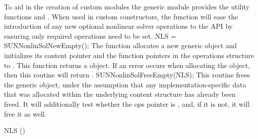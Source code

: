 To aid in the creation of custom {\sunnonlinsol} modules the generic
{\sunnonlinsol} module provides the utility functions 
and . When used in custom {\sunnonlinsol} constructors,
the function  will ease the introduction of any new
optional nonlinear solver operations to the {\sunnonlinsol} API by ensuring only
required operations need to be set.
%
%
{
  NLS = SUNNonlinSolNewEmpty();
}
{
  The function  allocates a new generic {\sunnonlinsol}
  object and initializes its content pointer and the function pointers in the
  operations structure to .
}
{}
{
  This function returns a  object. If an error occurs when
  allocating the object, then this routine will return .
}
{}
%
%
{
  SUNNonlinSolFreeEmpty(NLS);
}
{
  This routine frees the generic  object, under the assumption that any
  implementation-specific data that was allocated within the underlying content structure
  has already been freed. It will additionally test whether the ops pointer is , 
  and, if it is not, it will free it as well.
}
{
  \begin{args}[NLS]
  \item[NLS] ()
  \end{args}
}
{}
{}

